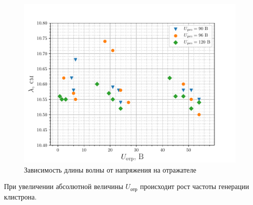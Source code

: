 \begin{figure}[H]
		\centering
		\includegraphics[width=\linewidth]{fig/task4a}
		\caption{Зависимость длины волны от напряжения на отражателе}
		\label{fig:task4a}
\end{figure}

При увеличении абсолютной величины $U_{\text{отр}}$ происходит рост частоты генерации клистрона. 

